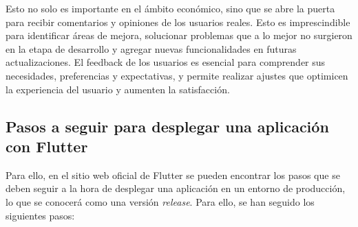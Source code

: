 \documentclass{article}
\begin{document}
Esto no solo es importante en el ámbito económico, sino que se abre la puerta para recibir comentarios y opiniones de los usuarios reales. Esto es imprescindible para identificar áreas de mejora, solucionar problemas que a lo mejor no surgieron en la etapa de desarrollo y agregar nuevas funcionalidades en futuras actualizaciones. El feedback de los usuarios es esencial para comprender sus necesidades, preferencias y expectativas, y permite realizar ajustes que optimicen la experiencia del usuario y aumenten la satisfacción.

\subsection{Pasos a seguir para desplegar una aplicación con Flutter}

Para ello, en el sitio web oficial de Flutter \cite{despliegue} se pueden encontrar los pasos que se deben seguir a la hora de desplegar una aplicación en un entorno de producción, lo que se conocerá como una versión \textit{release}. Para ello, se han seguido los siguientes pasos:
\end{document}

